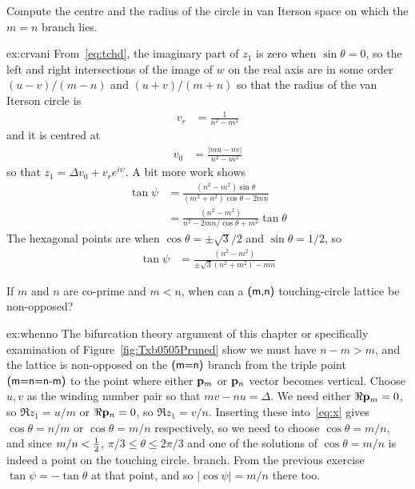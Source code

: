 \begin{jExercise}\label{ex:crvani}
		Compute the centre and the radius of the circle in van Iterson space on which the $m=n$ branch lies.
\end{jExercise}

\begin{jAnswer}{ex:crvani}
		From~\eqref{eq:tchd}, the imaginary part of $z_1$ is zero when  $\sin\theta=0$, so the left and right intersections of the image of $w$ on the real axis are in some order $(u-v)/(m-n)$ and $(u+v)/(m+n)$ so that the radius of the van Iterson circle
		is
\begin{align}	
			v_r &= \frac{1}{n^2-m^2}
\end{align}
and it is centred at
\begin{align}			v_0 &= \frac{|m u - n v|}{n^2-m^2}
\end{align}	so that $z_1=\Delta v_0 + v_r e^{i\psi}$. 
A bit more work shows
\begin{align}
	\tan \psi &= \frac{ (n^2-m^2)\sin \theta}{(m^2+n^2)\cos\theta-2mn}
	\\
	&= \frac{ (n^2-m^2)}{n^2-2mn/\cos\theta+m^2}\tan\theta
\end{align}
The hexagonal points are when $\cos\theta=\pm\sqrt{3}/2$ and $\sin\theta=1/2$, so
\begin{align}
	\tan \psi 
	&= \frac{ (n^2-m^2)}{\pm\sqrt{3}(n^2+m^2)-mn }
\end{align}

	\end{jAnswer}
	
	\begin{jExercise}\label{ex:whenno}
		If $m$ and $n$ are co-prime and $m<n$, when can a $\textsf{(m,n)}$ touching-circle lattice be non-opposed?
	\end{jExercise}
	\begin{jAnswer}{ex:whenno}
		The bifurcation theory argument of this chapter or specifically examination of Figure~\ref{fig:Txb0505Pruned} show we must have $n-m>m$, 
		and the lattice is non-opposed  on the $\textsf{(m=n)}$ branch from the triple point $\textsf{(m=n=n-m)}$ to the point where either ${\mathbf p}_{m}$ or ${\mathbf p}_{n}$ vector becomes vertical.
			Choose $u,v$ as the winding number pair so that $m v - n u=\Delta$. We need either $\Re {\mathbf p}_{m}=0$, so $\Re z_1=u/m$ or $\Re {\mathbf p}_{n}=0$, so $\Re z_1=v/n$. Inserting these into~\ref{eq:x} gives $\cos\theta=n/m$ or $\cos\theta=m/n$ respectively, so we need to choose $\cos\theta=m/n$,
			and since $m/n<\textstyle{\frac{1}{2}}$, $\pi/3\leq\theta\leq 2\pi/3$ and one of the solutions of  $\cos\theta=m/n$ is indeed a point on the touching circle.
			 branch. From the previous exercise $\tan\psi=-\tan\theta$ at that point, 
			 and so $|\cos\psi|=m/n$ there too. 
	\end{jAnswer}
	


